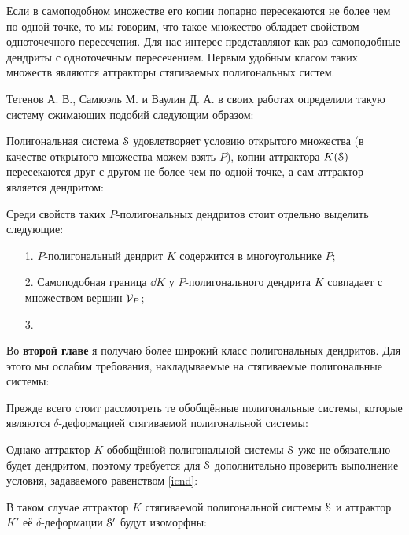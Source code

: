 Если в самоподобном множестве его копии попарно пересекаются не более чем по одной точке, то мы говорим, что такое множество обладает свойством одноточечного пересечения.
Для нас интерес представляют как раз самоподобные дендриты с одноточечным пересечением.
Первым удобным класом таких множеств являются аттракторы стягиваемых полигональных систем.

Тетенов А. В., Самюэль М. и Ваулин Д. А. в своих работах \cite{TSV2017, STV2017} определили такую систему сжимающих подобий следующим образом:


Полигональная система ${\EuScript S}$ удовлетворяет условию открытого множества (в качестве открытого множества можем взять $\dot P$), копии аттрактора $K({\EuScript S})$ пересекаются друг с другом не более чем по одной точке, а сам аттрактор является дендритом:


Среди свойств таких $P$-полигональных дендритов стоит отдельно выделить следующие:
\begin{enumerate}
\item[1.] $P$-полигональный дендрит $K$ содержится в многоугольнике $P$;
\item[2.] Самоподобная граница $\dd K$ у $P$-полигонального дендрита $K$ совпадает с множеством вершин ${\mathcal V}_P$;
\item[3.]
\end{enumerate}


Во \textbf{второй главе} я получаю более широкий класс полигональных дендритов. 
Для этого мы ослабим требования, накладываемые на стягиваемые полигональные системы:


Прежде всего стоит рассмотреть те обобщённые полигональные системы, которые являются $\delta$-деформацией стягиваемой полигональной системы:



Однако аттрактор $K$ обобщённой полигональной системы ${\EuScript S}$ уже не обязательно будет дендритом, поэтому требуется для ${\EuScript S}$ дополнительно проверить выполнение условия, задаваемого равенством \eqref{icnd}:


В таком случае аттрактор $K$ стягиваемой полигональной системы ${\EuScript S}$ и аттрактор $K'$ её $\delta$-деформации ${\EuScript S}'$ будут изоморфны:

